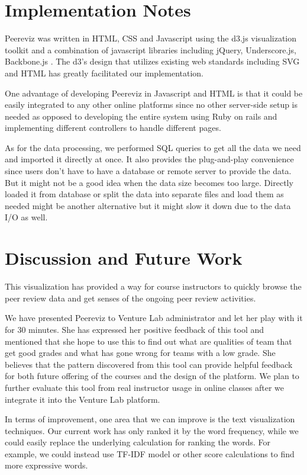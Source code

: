 \documentclass{sigchi}
\begin{document}
\section{Implementation Notes} Peereviz was written in HTML, CSS and
Javascript using the d3.js visualization toolkit \cite{d3} and a combination
of javascript libraries including jQuery, Underscore.js, Backbone.js
\cite{jquery,underscore,backbone}.  The d3’s design that utilizes existing web
standards including SVG and HTML has greatly facilitated our implementation.

One advantage of developing Peereviz in Javascript and HTML is that it could
be easily integrated to any other online platforms since no other server-side
setup is needed as opposed to developing the entire system using Ruby on rails
and implementing different controllers to handle different pages.

As for the data processing, we performed SQL queries to get all the data we
need and imported it directly at once. It also provides the plug-and-play
convenience since users don't have to have a database or remote server to
provide the data. But it might not be a good idea when the data size becomes
too large. Directly loaded it from database or split the data into separate
files and load them as needed might be another alternative but it might slow
it down due to the data I/O as well.

\section{Discussion and Future Work}

This visualization has provided a way for course instructors to
quickly browse the peer review data and get senses of the ongoing peer review
activities.

We have presented Peereviz to Venture Lab administrator and let her play with it for
30 minutes.  She has expressed her positive feedback of this tool and mentioned
that she hope to use this to find out what are qualities of team that get good grades
and what has gone  wrong for teams with a low grade.  She believes that the pattern
discovered from this tool can provide helpful feedback for both future offering
of the courses and the design of the platform.
We plan to further evaluate this tool from real instructor usage in online classes
after we integrate it into the Venture Lab platform.

In terms of improvement, one area that we can improve is the text visualization techniques.
Our current
work has only ranked it by the word frequency, while we could easily replace the
underlying calculation for ranking the words. For example, we could instead use
TF-IDF model \cite{manning2008} or other score calculations to find more
expressive words.
\end{document}
